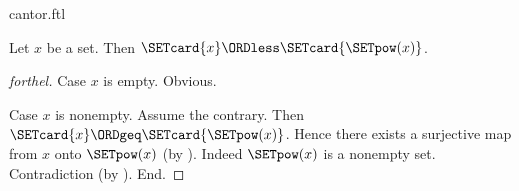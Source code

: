 \documentclass{naproche-library}
\begin{document}
\begin{smodule}[title=Cantor's Theorem]{cantor.ftl}

\begin{theorem}[forthel,title=Cantor's Theorem,id=cantor_389275382172394]
  Let $x$ be a set.
  Then $\SETcard{x} \ORDless \SETcard{\SETpow(x)}$.
\end{theorem}
\begin{proof}[forthel]
  Case $x$ is empty. Obvious.

  Case $x$ is nonempty.
    Assume the contrary.
    Then $\SETcard{x} \ORDgeq \SETcard{\SETpow(x)}$.
    Hence there exists a surjective map from $x$ onto $\SETpow(x)$ (by ).
    Indeed $\SETpow(x)$ is a nonempty set.
    Contradiction (by ).
  End.
\end{proof}
\end{smodule}
\end{document}
